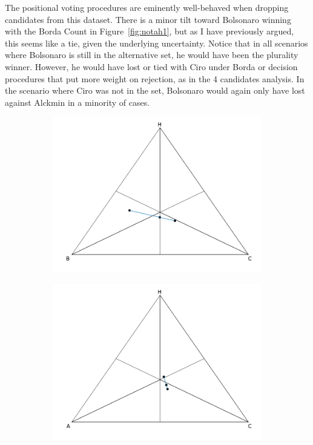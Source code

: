 \documentclass[hidelinks,11pt]{article} \usepackage[utf8]{inputenc}
\begin{document}
The positional voting procedures are eminently well-behaved when dropping candidates from this dataset. There is a minor tilt toward Bolsonaro winning with the Borda Count in Figure~\ref{fig:notah1}, but as I have previously argued, this seems like a tie, given the underlying uncertainty. Notice that in all scenarios where Bolsonaro is still in the alternative set, he would have been the plurality winner. However, he would have lost or tied with Ciro under Borda or decision procedures that put more weight on rejection, as in the 4 candidates analysis. In the scenario where Ciro was not in the set, Bolsonaro would again only have lost against Alckmin in a minority of cases.


\begin{figure}[!h] \centering
        \begin{subfigure}[b]{0.475\textwidth} \centering
\includegraphics[width=\textwidth]{./images/cw1_nota.png}
             \caption{}%
            \label{fig:notac1}
        \end{subfigure} \hfill
        \begin{subfigure}[b]{0.475\textwidth} \centering
\includegraphics[width=\textwidth]{./images/cw1_notb.png}

\end{subfigure}
\end{figure}
\end{document}
